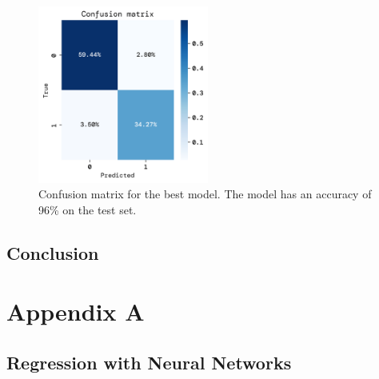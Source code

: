 \documentclass[twoside,11pt]{report}
\begin{document}
\begin{figure}[h]
        \begin{center}
            \includegraphics[width=0.5\textwidth]{../runsAndFigures/confusion_matrix.png}
        \end{center}
        \caption
        {
            Confusion matrix for the best model. 
            The model has an accuracy of 96\% on the test set.
        }\label{fig:confusion_matrix}
    \end{figure}



\section{Conclusion}
\label{sec:conclusion}
























\clearpage 

\appendix
\renewcommand{\theHchapter}{appendix\Alph{chapter}}
\renewcommand{\theHsection}{appendix\thesection}

{}


\chapter*{Appendix A}
\label{app:appendixA}


\section{Regression with Neural Networks}
\label{sec:regression}
\end{document}
